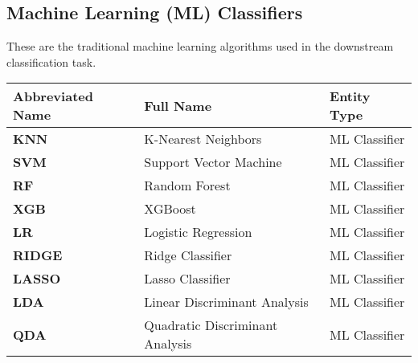 \documentclass[11pt]{article}
\begin{document}
\subsection*{Machine Learning (ML) Classifiers}
These are the traditional machine learning algorithms used in the downstream classification task.
\begin{table}[h!]
\centering
\begin{tabular}{@{}lll@{}}
\toprule
\textbf{Abbreviated Name} & \textbf{Full Name}                      & \textbf{Entity Type} \\ \midrule
\textbf{KNN}              & K-Nearest Neighbors                     & ML Classifier        \\
\textbf{SVM}              & Support Vector Machine                  & ML Classifier        \\
\textbf{RF}               & Random Forest                           & ML Classifier        \\
\textbf{XGB}              & XGBoost                                 & ML Classifier        \\
\textbf{LR}               & Logistic Regression                     & ML Classifier        \\
\textbf{RIDGE}            & Ridge Classifier                        & ML Classifier        \\
\textbf{LASSO}            & Lasso Classifier                        & ML Classifier        \\
\textbf{LDA}              & Linear Discriminant Analysis            & ML Classifier        \\
\textbf{QDA}              & Quadratic Discriminant Analysis         & ML Classifier        \\ \bottomrule
\end{tabular}
\end{table}
\end{document}
